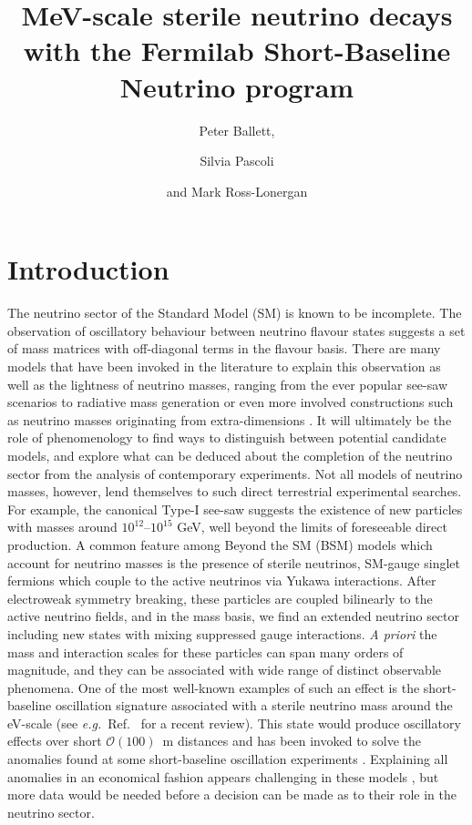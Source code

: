 \documentclass[11pt, a4paper]{article}
\title{MeV-scale sterile neutrino decays with the Fermilab Short-Baseline Neutrino program}
\author{Peter Ballett,}
\author{Silvia Pascoli}
\author{and Mark Ross-Lonergan}
\affiliation{Institute for Particle Physics Phenomenology, Department of
Physics, Durham University, South Road, Durham DH1 3LE, United Kingdom}
\newcommand{\refref}[1]{Ref.~\cite{#1}}
\def\eg{\emph{e.g.}}
\begin{document}
 

\maketitle

\section{Introduction}

The neutrino sector of the Standard Model (SM) is known to be incomplete. The
observation of oscillatory behaviour between neutrino flavour states
\cite{Fukuda:1998mi} suggests a set of mass matrices with off-diagonal terms in
the flavour basis. There are many models that have been invoked in the
literature to explain this observation as well as the lightness of neutrino
masses, ranging from the ever popular see-saw scenarios \cite{Minkowski:1977sc,
GellMann:1980vs, Mohapatra:1979ia} to radiative mass generation
\cite{Zee:1980ai,Babu:1988ki} or even more involved constructions such as
neutrino masses originating from extra-dimensions \cite{ArkaniHamed:1998vp}.
It will ultimately be the role of phenomenology to find ways to distinguish
between potential candidate models, and explore what can be deduced about the
completion of the neutrino sector from the analysis of contemporary
experiments.
%
Not all models of neutrino masses, however, lend themselves to such direct
terrestrial experimental searches. For example, the canonical Type-I see-saw
\cite{Minkowski:1977sc, GellMann:1980vs, Mohapatra:1979ia} suggests the
existence of new particles with masses  around $10^{12}$--$10^{15}$ GeV, well
beyond the limits of foreseeable direct production. A common feature among
Beyond the SM (BSM) models which account for neutrino masses is the presence of
sterile neutrinos, SM-gauge singlet fermions which couple to the active
neutrinos via Yukawa interactions. After electroweak symmetry breaking, these
particles are coupled bilinearly to the active neutrino fields, and in the mass
basis, we find an extended neutrino sector including new states with mixing
suppressed gauge interactions. \emph{A priori} the mass and interaction scales
for these particles can span many orders of magnitude, and they can be
associated with wide range of distinct observable phenomena. 
%
One of the most well-known examples of such an effect is the short-baseline
oscillation signature associated with a sterile neutrino mass around the
eV-scale (see \eg\ \refref{Gariazzo:2015rra} for a recent review). This state
would produce oscillatory effects over short $\mathcal{O}(100)$~m distances and
has been invoked to solve the anomalies found at some short-baseline
oscillation experiments \cite{Aguilar:2001ty, Aguilar-Arevalo:2013pmq,
AguilarArevalo:2008rc}.  Explaining all anomalies in an economical fashion
appears challenging in these models \cite{Kopp:2013vaa,Conrad:2012qt}, but more
data would be needed before a decision can be made as to their role in the
neutrino sector. 
\end{document}
